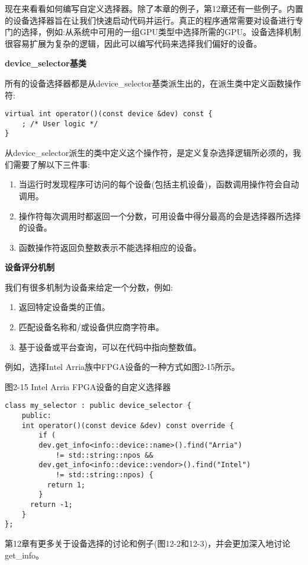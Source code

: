 现在来看看如何编写自定义选择器。除了本章的例子，第12章还有一些例子。内置的设备选择器旨在让我们快速启动代码并运行。真正的程序通常需要对设备进行专门的选择，例如:从系统中可用的一组GPU类型中选择所需的GPU。设备选择机制很容易扩展为复杂的逻辑，因此可以编写代码来选择我们偏好的设备。\par

\hspace*{\fill} \par %
\textbf{device\_selector基类}

所有的设备选择器都是从device\_selector基类派生出的，在派生类中定义函数操作符:\par

\begin{lstlisting}[caption={}]
virtual int operator()(const device &dev) const {
	; /* User logic */
}
\end{lstlisting}

从device\_selector派生的类中定义这个操作符，是定义复杂选择逻辑所必须的，我们需要了解以下三件事:\par

\begin{enumerate}
	\item 当运行时发现程序可访问的每个设备(包括主机设备)，函数调用操作符会自动调用。
	\item 操作符每次调用时都返回一个分数，可用设备中得分最高的会是选择器所选择的设备。
	\item 函数操作符返回负整数表示不能选择相应的设备。
\end{enumerate}

\hspace*{\fill} \par %
\textbf{设备评分机制}

我们有很多机制为设备来给定一个分数，例如:\par

\begin{enumerate}
	\item 返回特定设备类的正值。
	\item 匹配设备名称和/或设备供应商字符串。
	\item 基于设备或平台查询，可以在代码中指向整数值。
\end{enumerate}

例如，选择Intel Arria族中FPGA设备的一种方式如图2-15所示。\par

图2-15 Intel Arria FPGA设备的自定义选择器
\begin{lstlisting}[caption={}]
class my_selector : public device_selector {
	public:
	int operator()(const device &dev) const override {
		if (
		dev.get_info<info::device::name>().find("Arria")
			!= std::string::npos &&
		dev.get_info<info::device::vendor>().find("Intel")
			!= std::string::npos) {
		  return 1;
		}
	  return -1;
	}
};
\end{lstlisting}

第12章有更多关于设备选择的讨论和例子(图12-2和12-3)，并会更加深入地讨论get\_info。\par



